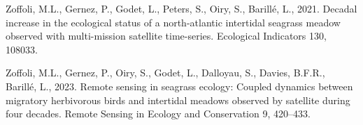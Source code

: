 \documentclass[
  letterpaper,
  DIV=11,
  numbers=noendperiod]{scrartcl}
\newlength{\cslhangindent}
\newenvironment{CSLReferences}[2] %
 {\begin{list}{}{%
  \setlength{\itemindent}{0pt}
  \setlength{\leftmargin}{0pt}
  \setlength{\parsep}{0pt}
  \ifodd #1
   \setlength{\leftmargin}{\cslhangindent}
   \setlength{\itemindent}{-1\cslhangindent}
  \fi
  \setlength{\itemsep}{#2\baselineskip}}}
 {\end{list}}
\begin{document}
\begin{CSLReferences}{1}{0}
Zoffoli, M.L., Gernez, P., Godet, L., Peters, S., Oiry, S., Barillé, L.,
2021. Decadal increase in the ecological status of a north-atlantic
intertidal seagrass meadow observed with multi-mission satellite
time-series. Ecological Indicators 130, 108033.

Zoffoli, M.L., Gernez, P., Oiry, S., Godet, L., Dalloyau, S., Davies,
B.F.R., Barillé, L., 2023. Remote sensing in seagrass ecology: Coupled
dynamics between migratory herbivorous birds and intertidal meadows
observed by satellite during four decades. Remote Sensing in Ecology and
Conservation 9, 420--433.

\end{CSLReferences}
\end{document}
